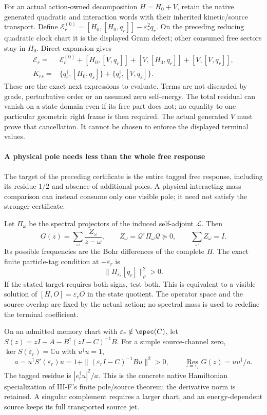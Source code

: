 \documentclass[12pt,a4paper]{article}
\begin{document}
For an actual action-owned decomposition $H=H_0+V$, retain the native
generated quadratic and interaction words with their inherited kinetic/source
transport. Define
$\mathcal E_r^{(0)}=[H_0,[H_0,q_r]]-\varepsilon_r^2q_r$.
On the preceding reducing quadratic clock chart it is the displayed Gram
defect; other consumed free sectors stay in $H_0$. Direct expansion gives
\[
 \boxed{\begin{aligned}
 \mathcal E_r={}&\mathcal E_r^{(0)}
   +[H_0,[V,q_r]]+[V,[H_0,q_r]]+[V,[V,q_r]],\\
 K_{rs}={}&\{q_r^\dagger,[H_0,q_s]\}
            +\{q_r^\dagger,[V,q_s]\}.
 \end{aligned}}
\]
These are the exact next expressions to evaluate. Terms are not discarded by
grade, perturbative order or an assumed zero self-energy. The total residual
can vanish on a state domain even if its free part does not; no equality to
one particular geometric right frame is then required. The actual generated $V$ must prove
that cancellation. It cannot be chosen to enforce the displayed terminal
values.


\paragraph{A physical pole needs less than the whole free response}
The target of the preceding certificate is the entire tagged free response,
including its residue $1/2$ and absence of additional poles. A physical
interacting mass comparison can instead consume only one visible pole; it
need not satisfy the stronger certificate.

Let $\Pi_\omega$ be the spectral projectors of the induced self-adjoint
$\mathcal L$. Then
\[
 \boxed{G(z)=\sum_\omega\frac{Z_\omega}{z-\omega},\qquad
 Z_\omega=\mathcal Q^\dagger\Pi_\omega\mathcal Q\succeq0,
 \qquad \sum_\omega Z_\omega=I.}
\]
Its possible frequencies are the Bohr differences of the complete $H$.
The exact finite particle-tag condition at $+\varepsilon_r$ is
\[
 \boxed{\|\Pi_{\varepsilon_r}[q_r]\|_\rho^2>0.}
\]
If the stated target requires both signs, test both. This is equivalent to a
visible solution of $[H,O]=\varepsilon_r O$ in the state quotient. The operator
space and the source overlap are fixed by the actual action; no spectral
mass is used to redefine the terminal coefficient.

On an admitted memory chart with $\varepsilon_r\notin\spec(C)$, let
$S(z)=zI-A-B^\dagger(zI-C)^{-1}B$. For a simple source-channel zero,
$\ker S(\varepsilon_r)=\mathbb C u$ with $u^\dagger u=1$,
\[
 a=u^\dagger S'(\varepsilon_r)u
   =1+\|(\varepsilon_r I-C)^{-1}Bu\|^2>0,
 \qquad
 \boxed{\operatorname*{Res}_{z=\varepsilon_r}G(z)=uu^\dagger/a.}
\]
The tagged residue is $|e_r^\dagger u|^2/a$. This is the concrete native
Hamiltonian specialization of III-F's finite pole/source theorem; the
derivative norm is retained. A singular complement requires a larger chart,
and an energy-dependent source keeps its full transported source jet.
\end{document}
